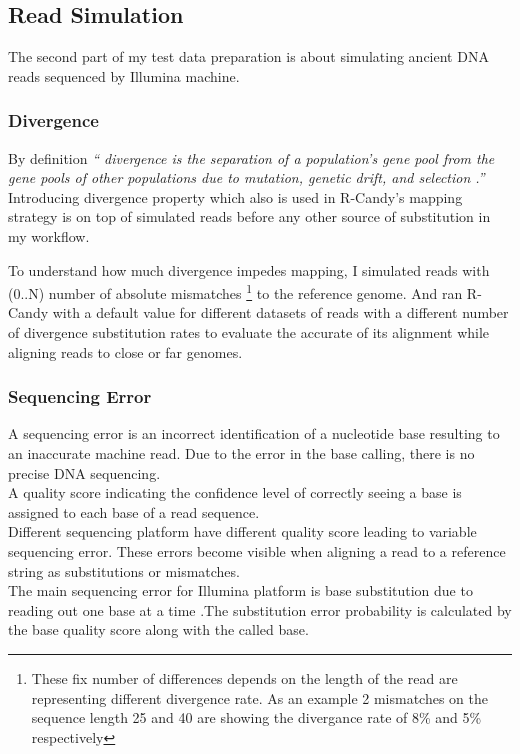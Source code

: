 \documentclass[11pt,a4paper]{report}
\newcommand{\quotes}[1]{``#1''}
\begin{document}

\subsection{Read Simulation} \label{Read Simulation}

The second part of my test data preparation is about simulating ancient DNA reads 
sequenced by Illumina machine.




\subsubsection{Divergence} \label{Divergence}

By definition \emph{\quotes{ divergence is the separation
of a population's gene pool from the gene pools of other populations 
due to mutation, genetic drift, and selection \cite{divergence1}.}}\\

Introducing divergence property which also is used in R-Candy's mapping strategy 
is on top of simulated reads before any other source of substitution in my workflow. 

To understand how much divergence impedes mapping, I simulated reads with (0..N) 
number of absolute mismatches \footnote {These fix number of differences depends 
on the length of the read are representing different divergence rate. As an example 
2 mismatches on the sequence length 25 and 40 are showing the divergance rate of 8\% 
and 5\% respectively} to the reference genome.
And ran R-Candy with a default value for different datasets of reads with a 
different number of divergence substitution rates to evaluate the accurate of its 
alignment while aligning reads to close or far genomes.
 
 

\subsubsection{Sequencing Error} \label{Sequencing Error}
 

A sequencing error is an incorrect identification of a nucleotide base resulting 
to an inaccurate machine read. Due to the error in the base calling, there is no 
precise DNA sequencing. \\
A quality score indicating the confidence level of correctly seeing a base is 
assigned to each base of a read sequence.\\
Different sequencing platform have different quality score leading to variable 
sequencing error. These errors become visible when aligning a read to a reference 
string as substitutions or mismatches.\\
The main sequencing error for Illumina platform is base substitution due to 
reading out one base at a time \cite{art}.The substitution error probability is 
calculated by the base quality score along with the called base.\\
\end{document}
